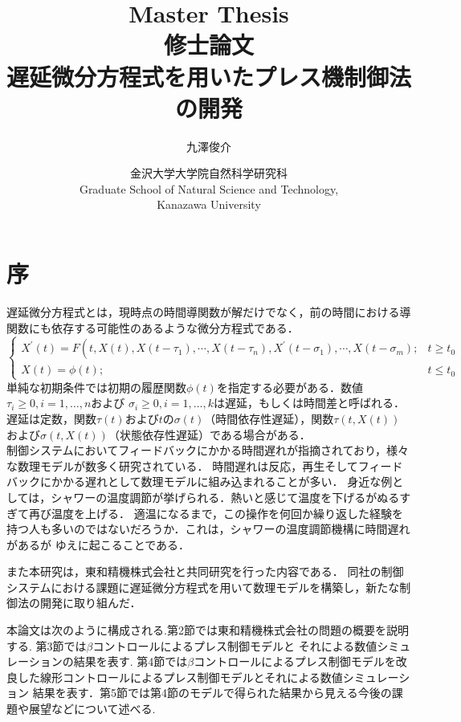 \documentclass [dvipdfmx] {jsarticle}
\title{Master Thesis \\ \bigskip 
修士論文 \\ \bigskip 
{\bf  遅延微分方程式を用いたプレス機制御法の開発 }\\ \bigskip 
}
\author{九澤俊介}
\date{金沢大学大学院自然科学研究科 \\
Graduate School of Natural Science and Technology, \\
Kanazawa University}
\numberwithin{equation}{section}
\theoremstyle{definition} %
\theoremstyle{definition} %
\begin{document}
\maketitle
\thispagestyle{empty}
\setcounter{page}{-1}


\thispagestyle{empty}

\mbox{}\newpage 

\tableofcontents
\clearpage
\section{序}
遅延微分方程式とは，現時点の時間導関数が解だけでなく，前の時間における導関数にも依存する可能性のあるような微分方程式である．
\begin{equation}
\left\{\begin{array}{cc}
    X^{\prime}(t)=F\left(t, X(t), X\left(t-\tau_1\right), \cdots, X\left(t-\tau_n\right), X^{\prime}\left(t-\sigma_1\right), \cdots, X\left(t-\sigma_m\right) ;\right. & t \geq t_0 \\
    X(t)=\phi(t) ; & t \leq t_0
    \end{array}\right.
\end{equation}
単純な初期条件では初期の履歴関数$\phi(t)$を指定する必要がある．数値$\tau_i \geq 0, i=1, \ldots, n$および
$\sigma_i \geq 0, i=1, \ldots, k$は遅延，もしくは時間差と呼ばれる．
遅延は定数，関数$\tau(t)$および$t$の$\sigma(t)$（時間依存性遅延），関数$\tau(t,X(t))$および$\sigma(t,X(t))$（状態依存性遅延）である場合がある．\\
制御システムにおいてフィードバックにかかる時間遅れが指摘されており，様々な数理モデルが数多く研究されている．
時間遅れは反応，再生そしてフィードバックにかかる遅れとして数理モデルに組み込まれることが多い．
身近な例としては，シャワーの温度調節が挙げられる．熱いと感じて温度を下げるがぬるすぎて再び温度を上げる．
適温になるまで，この操作を何回か繰り返した経験を持つ人も多いのではないだろうか．これは，シャワーの温度調節機構に時間遅れがあるが
ゆえに起こることである．

また本研究は，東和精機株式会社と共同研究を行った内容である．
同社の制御システムにおける課題に遅延微分方程式を用いて数理モデルを構築し，新たな制御法の開発に取り組んだ．

本論文は次のように構成される.第2節では東和精機株式会社の問題の概要を説明する.
第3節では$\beta$コントロールによるプレス制御モデルと
それによる数値シミュレーションの結果を表す.
第4節では$\beta$コントロールによるプレス制御モデルを改良した線形コントロールによるプレス制御モデルとそれによる数値シミュレーション
結果を表す．第5節では第4節のモデルで得られた結果から見える今後の課題や展望などについて述べる.
\end{document}
